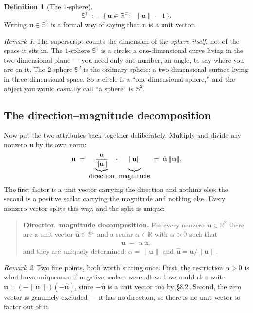 \documentclass[11pt]{article}
\theoremstyle{definition}
\newtheorem{defn}{Definition}[section]
\theoremstyle{remark}
\newtheorem*{rmk}{Remark}
\newcommand{\R}{\mathbb{R}}
\newcommand{\vc}[1]{\mathbf{#1}}
\newcommand{\norm}[1]{\lVert #1\rVert}
\newcommand{\uv}[1]{\hat{\vc{#1}}}                 %
\newcommand{\Sph}[1]{\mathbb{S}^{#1}}              %
\begin{document}
\begin{defn}[The $1$-sphere]
\[
  \Sph{1} \;:=\; \bigl\{\, \vc{u}\in\R^{2} \;:\; \norm{\vc{u}}=1 \,\bigr\}.
\]
Writing $\vc{u}\in\Sph{1}$ is a formal way of saying that $\vc{u}$ is a unit
vector.
\end{defn}

\begin{rmk}
The superscript counts the dimension of the \emph{sphere itself}, not of the
space it sits in. The $1$-sphere $\Sph{1}$ is a circle: a one-dimensional curve
living in the two-dimensional plane --- you need only one number, an angle, to
say where you are on it. The $2$-sphere $\Sph{2}$ is the ordinary sphere: a
two-dimensional surface living in three-dimensional space. So a circle is a
``one-dimensional sphere,'' and the object you would casually call ``a sphere''
is $\Sph{2}$.
\end{rmk}

\subsection{The direction--magnitude decomposition}
Now put the two attributes back together deliberately. Multiply and divide any
nonzero $\vc{u}$ by its own norm:
\[
  \vc{u}
  \;=\;
  \underbrace{\frac{\vc{u}}{\norm{\vc{u}}}}_{\textstyle\text{direction}}
  \cdot
  \underbrace{\vphantom{\frac{\vc{u}}{\norm{\vc{u}}}}\norm{\vc{u}}}_{\textstyle\text{magnitude}}
  \;=\;
  \uv{u}\,\norm{\vc{u}} .
\]
The first factor is a unit vector carrying the direction and nothing else; the
second is a positive scalar carrying the magnitude and nothing else. Every
nonzero vector splits this way, and the split is unique:

\begin{quote}
\textbf{Direction--magnitude decomposition.} For every nonzero
$\vc{u}\in\R^{2}$ there are a unit vector $\uv{u}\in\Sph{1}$ and a scalar
$\alpha\in\R$ with $\alpha>0$ such that
\[
  \vc{u} \;=\; \alpha\,\uv{u} ,
\]
and they are uniquely determined: $\alpha=\norm{\vc{u}}$ and
$\uv{u}=\vc{u}/\norm{\vc{u}}$.
\end{quote}

\begin{rmk}
Two fine points, both worth stating once. First, the restriction $\alpha>0$ is
what buys uniqueness: if negative scalars were allowed we could also write
$\vc{u}=(-\norm{\vc{u}})(-\uv{u})$, since $-\uv{u}$ is a unit vector too by
\S8.2. Second, the zero vector is genuinely excluded --- it has no direction, so
there is no unit vector to factor out of it.
\end{rmk}
\end{document}
